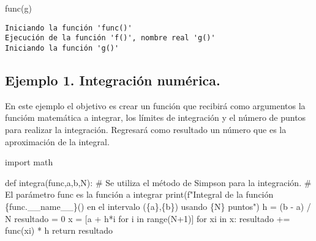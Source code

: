 \documentclass[
  letterpaper,
  DIV=11,
  numbers=noendperiod]{scrreprt}
\newenvironment{Shaded}{\begin{snugshade}}{\end{snugshade}}
\newcommand{\BuiltInTok}[1]{\textcolor[rgb]{0.00,0.23,0.31}{#1}}
\newcommand{\CommentTok}[1]{\textcolor[rgb]{0.37,0.37,0.37}{#1}}
\newcommand{\ControlFlowTok}[1]{\textcolor[rgb]{0.00,0.23,0.31}{#1}}
\newcommand{\DecValTok}[1]{\textcolor[rgb]{0.68,0.00,0.00}{#1}}
\newcommand{\ImportTok}[1]{\textcolor[rgb]{0.00,0.46,0.62}{#1}}
\newcommand{\KeywordTok}[1]{\textcolor[rgb]{0.00,0.23,0.31}{#1}}
\newcommand{\NormalTok}[1]{\textcolor[rgb]{0.00,0.23,0.31}{#1}}
\newcommand{\OperatorTok}[1]{\textcolor[rgb]{0.37,0.37,0.37}{#1}}
\newcommand{\SpecialCharTok}[1]{\textcolor[rgb]{0.37,0.37,0.37}{#1}}
\newcommand{\SpecialStringTok}[1]{\textcolor[rgb]{0.13,0.47,0.30}{#1}}
\newcommand{\VariableTok}[1]{\textcolor[rgb]{0.07,0.07,0.07}{#1}}
\begin{document}
\begin{Shaded}
\begin{Highlighting}[]
\NormalTok{func(g)}
\end{Highlighting}
\end{Shaded}

\begin{verbatim}
Iniciando la función 'func()'
Ejecución de la función 'f()', nombre real 'g()'
Iniciando la función 'g()'
\end{verbatim}

\subsection{\texorpdfstring{\textbf{Ejemplo 1. Integración
numérica.}}{Ejemplo 1. Integración numérica.}}\label{ejemplo-1.-integraciuxf3n-numuxe9rica.}

En este ejemplo el objetivo es crear un función que recibirá como
argumentos la funcióm matemática a integrar, los límites de integración
y el número de puntos para realizar la integración. Regresará como
resultado un número que es la aproximación de la integral.

\begin{Shaded}
\begin{Highlighting}[]
\ImportTok{import}\NormalTok{ math}

\KeywordTok{def}\NormalTok{ integra(func,a,b,N):}
    \CommentTok{\# Se utiliza el método de Simpson para la integración.}
    \CommentTok{\# El parámetro \textquotesingle{}func\textquotesingle{} es la función a integrar}
    \BuiltInTok{print}\NormalTok{(}\SpecialStringTok{f"Integral de la función }\SpecialCharTok{\{}\NormalTok{func}\SpecialCharTok{.}\VariableTok{\_\_name\_\_}\SpecialCharTok{\}}\SpecialStringTok{() en el intervalo (}\SpecialCharTok{\{}\NormalTok{a}\SpecialCharTok{\}}\SpecialStringTok{,}\SpecialCharTok{\{}\NormalTok{b}\SpecialCharTok{\}}\SpecialStringTok{) usando }\SpecialCharTok{\{}\NormalTok{N}\SpecialCharTok{\}}\SpecialStringTok{ puntos"}\NormalTok{)}
\NormalTok{    h }\OperatorTok{=}\NormalTok{ (b }\OperatorTok{{-}}\NormalTok{ a) }\OperatorTok{/}\NormalTok{ N}
\NormalTok{    resultado }\OperatorTok{=} \DecValTok{0}
\NormalTok{    x }\OperatorTok{=}\NormalTok{ [a }\OperatorTok{+}\NormalTok{ h}\OperatorTok{*}\NormalTok{i }\ControlFlowTok{for}\NormalTok{ i }\KeywordTok{in} \BuiltInTok{range}\NormalTok{(N}\OperatorTok{+}\DecValTok{1}\NormalTok{)]}
    \ControlFlowTok{for}\NormalTok{ xi }\KeywordTok{in}\NormalTok{ x:}
\NormalTok{        resultado }\OperatorTok{+=}\NormalTok{ func(xi) }\OperatorTok{*}\NormalTok{ h}
    \ControlFlowTok{return}\NormalTok{ resultado}
\end{Highlighting}
\end{Shaded}
\end{document}
